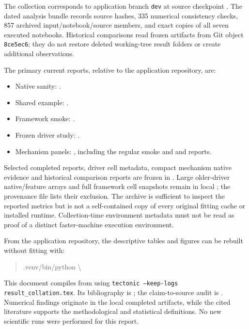 \documentclass[11pt,a4paper]{article}
\begin{document}
The collection corresponds to application branch \texttt{dev} at source checkpoint
. The dated analysis bundle records
source hashes, 335 numerical consistency checks, 857 archived input/notebook/source
members, and exact copies of all seven executed notebooks. Historical comparisons
read frozen artifacts from Git object \texttt{8ce5ec6}; they do not restore deleted
working-tree result folders or create additional observations.

The primary current reports, relative to the application repository, are:
\begin{itemize}
 \item Native sanity: .
 \item Shared example:
 .
 \item Framework smoke:
 .
 \item Frozen driver study:
 .
 \item Mechanism panels:
 ,
 including the regular smoke and  and
  reports.
\end{itemize}

Selected completed reports, driver cell metadata, compact mechanism native
evidence and historical comparison reports are frozen in
. Large older-driver native/feature
arrays and full framework cell snapshots remain in local ; the
provenance file lists their exclusion. The archive is sufficient to inspect the
reported metrics but is not a self-contained copy of every original fitting cache
or installed runtime. Collection-time environment metadata must not be read as
proof of a distinct faster-machine execution environment.

From the application repository, the descriptive tables and figures can be rebuilt
without fitting with:
\begin{quote}\footnotesize\ttfamily
.venv/bin/python \textbackslash{}\\
\hspace*{1em}
\end{quote}
This document compiles from  using
\texttt{tectonic --keep-logs result\_collation.tex}. Its bibliography is
; the claim-to-source audit is
. Numerical findings originate in the local
completed artifacts, while the cited literature supports the methodological and
statistical definitions. No new scientific runs were performed for this report.

{\small
\setlength{\parskip}{0pt}
\setlength{\bibsep}{0pt}

}
\end{document}
